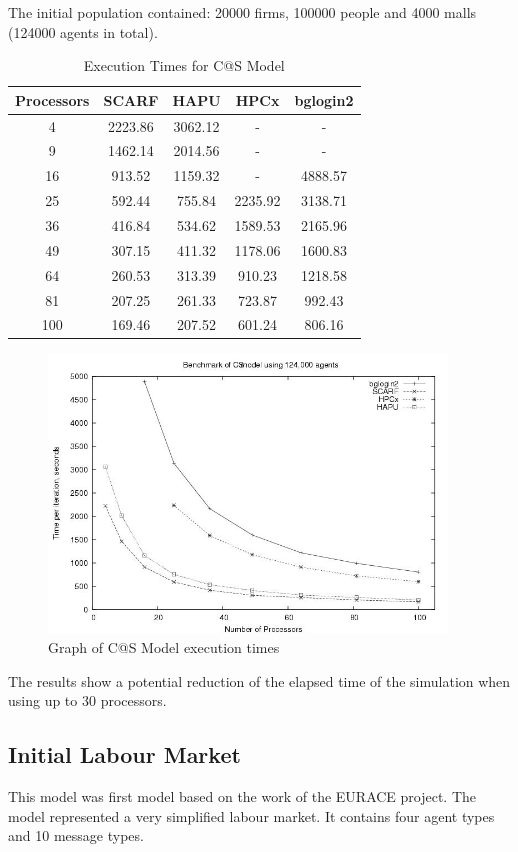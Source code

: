 The initial population contained: 20000 firms, 100000 people and 4000 malls (124000 agents in total).
{
\renewcommand{\arraystretch}{1.25}
\begin{table}[ht]
 \centering
  \begin{tabular}{c|cccc}
 Processors &SCARF &HAPU &HPCx  &bglogin2 \\ \hline
4 &2223.86 &3062.12 &- &-       \\
9 &1462.14 &2014.56 &- &-       \\
16 &913.52 &1159.32 &- &4888.57 \\
25 &592.44 &755.84 &2235.92 &3138.71    \\
36 &416.84 &534.62 &1589.53 &2165.96    \\
49 &307.15 &411.32 &1178.06 &1600.83    \\
64 &260.53 &313.39 &910.23 &1218.58     \\
81 &207.25 &261.33 &723.87 &992.43      \\
100 &169.46 &207.52 &601.24 &806.16     \\

 \end{tabular}
 \caption{Execution Times for C@S Model}
 \label{tab:ExecutionTimesForC@S}
\end{table}
}
\bigskip
\begin{figure}[ht]
 \centering
  \includegraphics[width=300pt]{C@S2-graph.jpg}
 \caption{Graph of C@S Model execution times}
 \label{fig:C@S-graph}
\end{figure}
The results show a potential reduction of the elapsed time of the simulation when using up to 30 processors.



\subsection{Initial Labour Market}
This model was first model based on the work of the EURACE project. The model represented a very simplified labour market. It contains four agent types and 10 message types.

